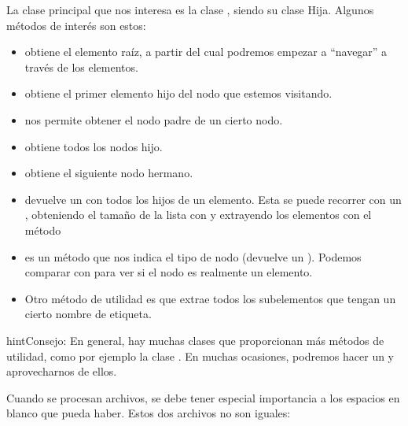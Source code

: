 \documentclass[letterpaper,10pt,spanish]{sphinxmanual}
\begin{document}
La clase principal que nos interesa es la clase , siendo  su clase Hija. Algunos métodos de interés son estos:
\begin{itemize}
\item {} 
 obtiene el elemento raíz, a partir del cual podremos empezar a ``navegar'' a través de los elementos.

\item {} 
 obtiene el primer elemento hijo del nodo que estemos visitando.

\item {} 
 nos permite obtener el nodo padre de un cierto nodo.

\item {} 
 obtiene todos los nodos hijo.

\item {} 
 obtiene el siguiente nodo hermano.

\item {} 
 devuelve un  con todos los hijos de un elemento. Esta  se puede recorrer con un , obteniendo el tamaño de la lista con  y extrayendo los elementos con el método 

\item {} 
 es un método que nos indica el tipo de nodo (devuelve un ). Podemos comparar con  para ver si el nodo es realmente un elemento.

\item {} 
Otro método de utilidad es  que extrae todos los subelementos que tengan un cierto nombre de etiqueta.

\end{itemize}

\begin{notice}{hint}{Consejo:}
En general, hay muchas clases que proporcionan más métodos de utilidad, como por ejemplo la clase . En muchas ocasiones, podremos hacer un  y aprovecharnos de ellos.
\end{notice}

Cuando se procesan archivos, se debe tener especial importancia a los espacios en blanco que pueda haber. Estos dos archivos no son iguales:
\end{document}
